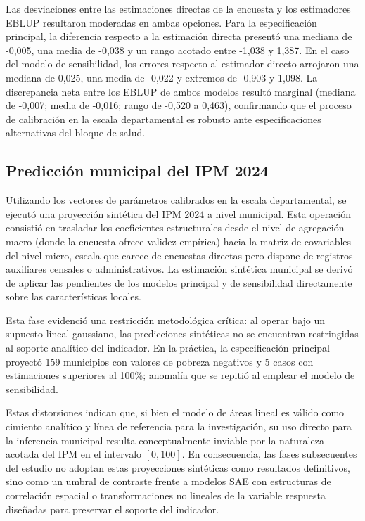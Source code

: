 Las desviaciones entre las estimaciones directas de la encuesta y los estimadores EBLUP resultaron moderadas en ambas opciones. Para la especificación principal, la diferencia respecto a la estimación directa presentó una mediana de -0,005, una media de -0,038 y un rango acotado entre -1,038 y 1,387. En el caso del modelo de sensibilidad, los errores respecto al estimador directo arrojaron una mediana de 0,025, una media de -0,022 y extremos de -0,903 y 1,098. La discrepancia neta entre los EBLUP de ambos modelos resultó marginal (mediana de -0,007; media de -0,016; rango de -0,520 a 0,463), confirmando que el proceso de calibración en la escala departamental es robusto ante especificaciones alternativas del bloque de salud.

\subsection{Predicción municipal del IPM 2024}
Utilizando los vectores de parámetros calibrados en la escala departamental, se ejecutó una proyección sintética del IPM 2024 a nivel municipal. Esta operación consistió en trasladar los coeficientes estructurales desde el nivel de agregación macro (donde la encuesta ofrece validez empírica) hacia la matriz de covariables del nivel micro, escala que carece de encuestas directas pero dispone de registros auxiliares censales o administrativos. La estimación sintética municipal se derivó de aplicar las pendientes de los modelos principal y de sensibilidad directamente sobre las características locales.

Esta fase evidenció una restricción metodológica crítica: al operar bajo un supuesto lineal gaussiano, las predicciones sintéticas no se encuentran restringidas al soporte analítico del indicador. En la práctica, la especificación principal proyectó 159 municipios con valores de pobreza negativos y 5 casos con estimaciones superiores al 100\%; anomalía que se repitió al emplear el modelo de sensibilidad.

Estas distorsiones indican que, si bien el modelo de áreas lineal es válido como cimiento analítico y línea de referencia para la investigación, su uso directo para la inferencia municipal resulta conceptualmente inviable por la naturaleza acotada del IPM en el intervalo $[0, 100]$. En consecuencia, las fases subsecuentes del estudio no adoptan estas proyecciones sintéticas como resultados definitivos, sino como un umbral de contraste frente a modelos SAE con estructuras de correlación espacial o transformaciones no lineales de la variable respuesta diseñadas para preservar el soporte del indicador.